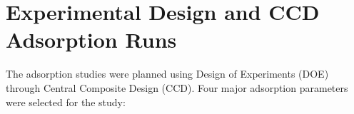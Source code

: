 

\section{Experimental Design and CCD Adsorption Runs}

The adsorption studies were planned using Design of Experiments (DOE) through 
Central Composite Design (CCD). Four major adsorption parameters were selected 
for the study:

